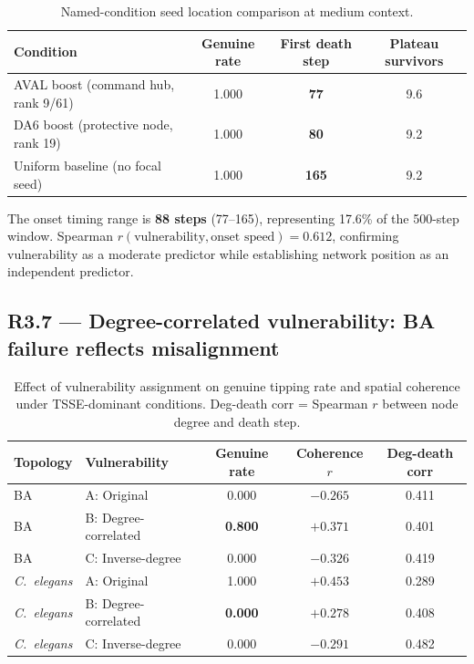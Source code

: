 \documentclass[12pt,a4paper]{article}
\begin{document}
\begin{table}[H]
\centering
\caption{Named-condition seed location comparison at medium context.}
\label{tab:r36_seed}
\begin{tabular}{lccc}
\toprule
\textbf{Condition} & \textbf{Genuine rate} & \textbf{First death step} & \textbf{Plateau survivors} \\
\midrule
AVAL boost (command hub, rank 9/61)    & 1.000 & \textbf{77}  & 9.6 \\
DA6 boost (protective node, rank 19)   & 1.000 & \textbf{80}  & 9.2 \\
Uniform baseline (no focal seed)       & 1.000 & \textbf{165} & 9.2 \\
\bottomrule
\end{tabular}
\end{table}

The onset timing range is \textbf{88 steps} (77--165), representing 17.6\% of the 500-step
window. Spearman $r(\text{vulnerability}, \text{onset speed}) = 0.612$, confirming
vulnerability as a moderate predictor while establishing network position as an independent
predictor.

\subsection{R3.7 --- Degree-correlated vulnerability: BA failure reflects misalignment}

\begin{table}[H]
\centering
\caption{Effect of vulnerability assignment on genuine tipping rate and spatial coherence under TSSE-dominant conditions. Deg-death corr = Spearman $r$ between node degree and death step.}
\label{tab:r37_vuln}
\small
\begin{tabular}{llccc}
\toprule
\textbf{Topology} & \textbf{Vulnerability} & \textbf{Genuine rate} & \textbf{Coherence $r$} & \textbf{Deg-death corr} \\
\midrule
BA                  & A: Original            & 0.000          & $-0.265$ & 0.411 \\
BA                  & B: Degree-correlated   & \textbf{0.800} & $+0.371$ & 0.401 \\
BA                  & C: Inverse-degree      & 0.000          & $-0.326$ & 0.419 \\
\textit{C.~elegans} & A: Original            & 1.000          & $+0.453$ & 0.289 \\
\textit{C.~elegans} & B: Degree-correlated   & \textbf{0.000} & $+0.278$ & 0.408 \\
\textit{C.~elegans} & C: Inverse-degree      & 0.000          & $-0.291$ & 0.482 \\
\bottomrule
\end{tabular}
\end{table}
\end{document}
